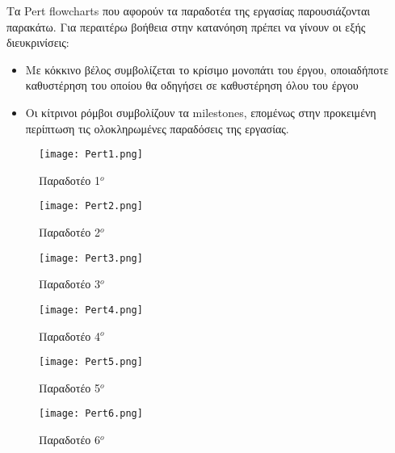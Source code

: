 \documentclass{article}
\begin{document}
Τα Pert flowcharts που αφορούν τα παραδοτέα της εργασίας παρουσιάζονται παρακάτω. Για περαιτέρω βοήθεια στην κατανόηση πρέπει να γίνουν οι εξής διευκρινίσεις:

\begin{itemize}
  \item Με κόκκινο βέλος συμβολίζεται το κρίσιμο μονοπάτι του έργου, οποιαδήποτε καθυστέρηση του οποίου θα οδηγήσει σε καθυστέρηση όλου του έργου
  \item Οι κίτρινοι ρόμβοι συμβολίζουν τα milestones, επομένως στην προκειμένη περίπτωση τις ολοκληρωμένες παραδόσεις της εργασίας.
\end{itemize}

\begin{figure}[!htb]
\centering
\texttt{[image: Pert1.png]}
\caption{\label{fig:Pert1} Παραδοτέο 1$^o$}
\end{figure}

\newpage

\begin{figure}[!htb]
\centering
\texttt{[image: Pert2.png]}
\caption{\label{fig:Pert2} Παραδοτέο 2$^o$}
\end{figure}

\begin{figure}[!htb]
\centering
\texttt{[image: Pert3.png]}
\caption{\label{fig:Pert3} Παραδοτέο 3$^o$}
\end{figure}

\begin{figure}[!htb]
\centering
\texttt{[image: Pert4.png]}
\caption{\label{fig:Pert4} Παραδοτέο 4$^o$}
\end{figure}

\newpage

\begin{figure}[!htb]
\centering
\texttt{[image: Pert5.png]}
\caption{\label{fig:Pert5} Παραδοτέο 5$^o$}
\end{figure}

\begin{figure}[!htb]
\centering
\texttt{[image: Pert6.png]}
\caption{\label{fig:Pert6} Παραδοτέο 6$^o$}
\end{figure}
\end{document}

